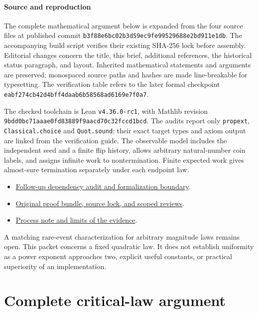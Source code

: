 \subsection*{Source and reproduction}
The complete mathematical argument below is expanded from the four
source files at published commit
\texttt{b3f88e6bc02b3d59ec9fe99529688e2bd911e1db}.
The accompanying build script verifies their existing SHA-256 lock before
assembly. Editorial changes concern the title, this brief, additional references,
the historical status paragraph, and layout. Inherited mathematical statements and arguments are preserved;
monospaced source paths and hashes are made line-breakable for typesetting.
The verification table refers to the later formal checkpoint
\nolinkurl{eabf274cb42d4bff4daab6b58568ad6169e7f0a7}.

The checked toolchain is Lean \texttt{v4.36.0-rc1}, with Mathlib revision
\nolinkurl{9bdd0bc71aaae0fd83889f9aacd70c32fccd1bcd}.
The audits report only \texttt{propext}, \texttt{Classical.choice} and
\texttt{Quot.sound}; their exact target types and axiom output are linked
from the verification guide. The observable model includes the independent
seed and a finite flip history, allows arbitrary natural-number coin labels,
and assigns infinite work to nontermination. Finite expected work gives
almost-sure termination separately under each endpoint law.

\begin{itemize}
\item \href{https://github.com/davidiach/adaptive-threshold-estimation/blob/eabf274cb42d4bff4daab6b58568ad6169e7f0a7/docs/CRITICAL_AUDIT.md}{Follow-up dependency audit and formalization boundary}.
\item \href{https://github.com/davidiach/adaptive-threshold-estimation/tree/b3f88e6bc02b3d59ec9fe99529688e2bd911e1db/research/2026-10-27-nonlinear-critical}{Original proof bundle, source lock, and scoped reviews}.
\item \href{https://github.com/davidiach/adaptive-threshold-estimation/blob/6009662a5581b31de17c8956b6fd93e4279ba087/docs/process/METHOD.md}{Process note and limits of the evidence}.
\end{itemize}

\noindent A matching rare-event characterization for arbitrary magnitude laws remains
open. This packet concerns a fixed quadratic law. It does not establish
uniformity as a power exponent approaches two, explicit useful constants,
or practical superiority of an implementation.

\endgroup
\clearpage
\part*{Complete critical-law argument}
